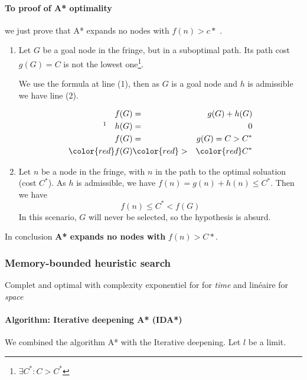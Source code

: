 \paragraph{To proof of A* optimality}


we just prove that A* expands no nodes with $f(n) > c*$ .
\begin{enumerate}

    \item Let  $G$ be  a goal node  in the fringe,  but in  a suboptimal
    path. Its path cost $g(G)=C$ is not the lowest one\footnote{$\exists
    C^* : C  > C^*$}. 
    
    We use the  formula at line (1), then as  $G$ is a
    goal node and $h$ is admissible we have line (2).

        \begin{eqnarray}
            f(G) &=& g(G) + h(G)\\
            \footnotemark\quad h(G) &=& 0 \\
            f(G) &=& g(G) = C > C^*\\
            \color{red}f(G) &\color{red}>&\color{red} C^*
        \end{eqnarray}

    \item Let $n$ be a node in the fringe, with $n$ in the path to the optimal soluation (cost $C^*$). As $h$ is admissible, we have $f(n) = g(n) + h(n) \leq C^*$. Then we have
    $$f(n) \leq C^* < f(G)$$
    In this scenario, $G$ will never be selected, so the hypothesis is absurd. 
\end{enumerate}

In conclusion \textbf{A* expands no nodes with} $f(n) > C*$.

\subsubsection{Memory-bounded heuristic search}

Complet and  optimal with  complexity exponentiel for  for \textit{time}
and linéaire for \textit{space} 

\paragraph{Algorithm: Iterative deepening A* (IDA*)}

We combined the algorithm A* with the Iterative deepening. Let $l$ be a limit.

